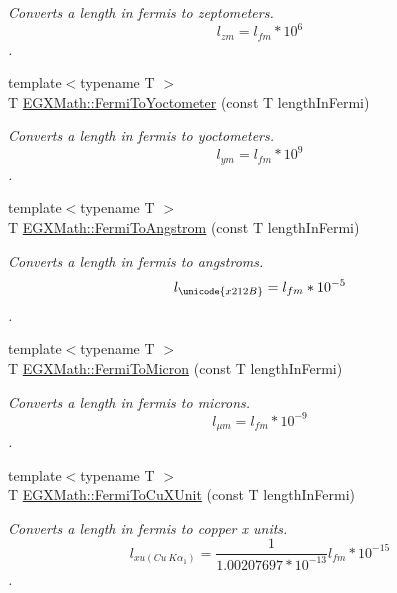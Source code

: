 \begin{DoxyCompactItemize}
\begin{DoxyCompactList}\small\item\em Converts a length in fermis to zeptometers. \[ l_{zm}=l_{fm} * 10^{6} \]. \end{DoxyCompactList}\item 
{\footnotesize template$<$typename T $>$ }\\T \mbox{\hyperlink{group___e_g_x_math-_conversions-_length_conversions-_non-_s_i-_fermi-_s_i_gaea7ea589aa3d8270226626bf82c66595}{E\+G\+X\+Math\+::\+Fermi\+To\+Yoctometer}} (const T length\+In\+Fermi)
\begin{DoxyCompactList}\small\item\em Converts a length in fermis to yoctometers. \[ l_{ym}=l_{fm} * 10^{9} \]. \end{DoxyCompactList}\item 
{\footnotesize template$<$typename T $>$ }\\T \mbox{\hyperlink{group___e_g_x_math-_conversions-_length_conversions-_non-_s_i-_fermi-_non-_s_i_ga9bec1d5936dfd3fa360cf3484685cc23}{E\+G\+X\+Math\+::\+Fermi\+To\+Angstrom}} (const T length\+In\+Fermi)
\begin{DoxyCompactList}\small\item\em Converts a length in fermis to angstroms. \[ l_{\unicode{x212B}}=l_{fm} * 10^{-5} \]. \end{DoxyCompactList}\item 
{\footnotesize template$<$typename T $>$ }\\T \mbox{\hyperlink{group___e_g_x_math-_conversions-_length_conversions-_non-_s_i-_fermi-_non-_s_i_ga8a55f7fbfb5e78f8b22efaeaac18f63b}{E\+G\+X\+Math\+::\+Fermi\+To\+Micron}} (const T length\+In\+Fermi)
\begin{DoxyCompactList}\small\item\em Converts a length in fermis to microns. \[ l_{\mu m}=l_{fm} * 10^{-9} \]. \end{DoxyCompactList}\item 
{\footnotesize template$<$typename T $>$ }\\T \mbox{\hyperlink{group___e_g_x_math-_conversions-_length_conversions-_non-_s_i-_fermi-_non-_s_i_ga8c0963430e8fec7c613543844bd80064}{E\+G\+X\+Math\+::\+Fermi\+To\+Cu\+X\+Unit}} (const T length\+In\+Fermi)
\begin{DoxyCompactList}\small\item\em Converts a length in fermis to copper x units. \[ l_{xu(Cu\ K\alpha_1)}= \frac{1}{1.00207697*10^{-13}} l_{fm} * 10^{-15}\]. \end{DoxyCompactList}\item 

\end{DoxyCompactItemize}
